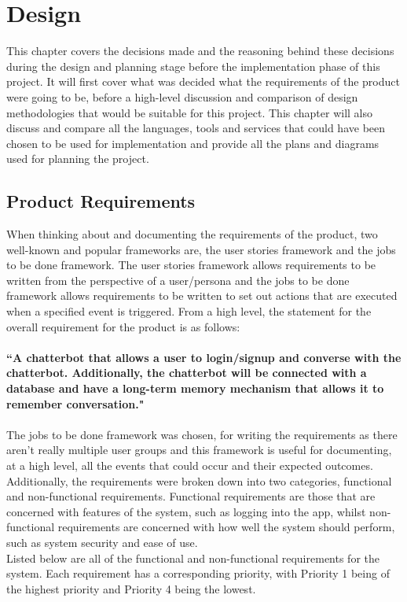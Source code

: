%
%
\chapter{Design} \label{chap:design}
This chapter covers the decisions made and the reasoning behind these decisions during the design and planning stage before the implementation phase of this project. It will first cover what was decided what the requirements of the product were going to be, before a high-level discussion and comparison of design methodologies that would be suitable for this project. This chapter will also discuss and compare all the languages, tools and services that could have been chosen to be used for implementation and provide all the plans and diagrams used for planning the project.
\section{Product Requirements}
When thinking about and documenting the requirements of the product, two well-known and popular frameworks are, the user stories framework and the jobs to be done framework. The user stories framework allows requirements to be written from the perspective of a user/persona and the jobs to be done framework allows requirements to be written to set out actions that are executed when a specified event is triggered. From a high level, the statement for the overall requirement for the product is as follows:\\\\
\textbf{``A chatterbot that allows a user to login/signup and converse with the chatterbot. Additionally, the chatterbot will be connected with a database and have a long-term memory mechanism that allows it to remember conversation."}\\\\
The jobs to be done framework was chosen, for writing the requirements as there aren't really multiple user groups and this framework is useful for documenting, at a high level, all the events that could occur and their expected outcomes. Additionally, the requirements were broken down into two categories, functional and non-functional requirements. Functional requirements are those that are concerned with features of the system, such as logging into the app, whilst non-functional requirements are concerned with how well the system should perform, such as system security and ease of use.\\
Listed below are all of the functional and non-functional requirements for the system. Each requirement has a corresponding priority, with Priority 1 being of the highest priority and Priority 4 being the lowest.
